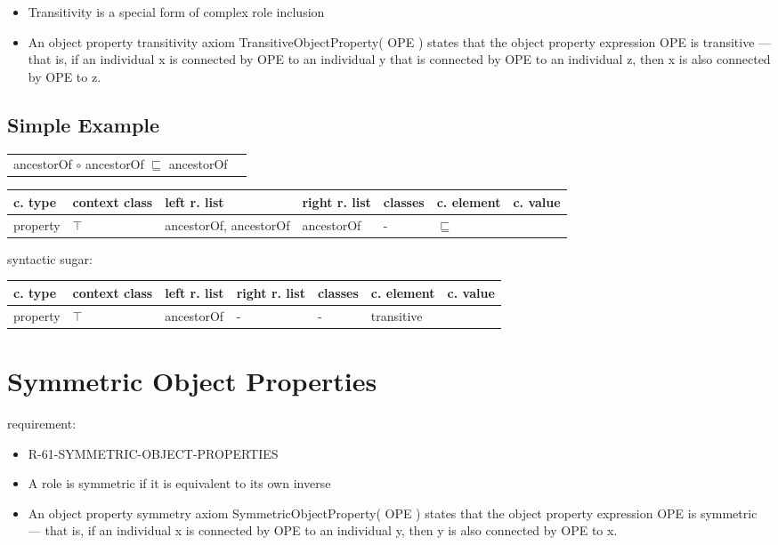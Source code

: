 \documentclass{llncs}
\newenvironment{gcotable}{
  \scriptsize
  \sffamily
  \vspace{0.3cm}
	\begin{center}
  \begin{tabular}{l|l|l|l|l|l|l}
  \hline
  \textbf{c. type} & \textbf{context class} & \textbf{left r. list} & \textbf{right r. list} & \textbf{classes} & \textbf{c. element} & \textbf{c. value} \\
  \hline

}{
  \hline
  \end{tabular}
	\end{center}
}
\newenvironment{DL}{
	\begin{center}
  \begin{tabular}{r l}

}{
  \end{tabular}
	\end{center}
}
\begin{document}
\begin{itemize}
	\item Transitivity is a special form of complex role inclusion
	\item An object property transitivity axiom TransitiveObjectProperty( OPE ) states that the object property expression OPE is transitive — that is, if an individual x is connected by OPE to an individual y that is connected by OPE to an individual z, then x is also connected by OPE to z.
\end{itemize}

\subsection{Simple Example}

\begin{DL}
ancestorOf $\circ$ ancestorOf $\sqsubseteq$ ancestorOf
\end{DL}

\begin{gcotable}
property & $\top$ & ancestorOf, ancestorOf & ancestorOf & - & $\sqsubseteq$ \\
\end{gcotable}

syntactic sugar:

\begin{gcotable}
property & $\top$ & ancestorOf & - & - & transitive \\
\end{gcotable}

\section{Symmetric Object Properties}

requirement:

\begin{itemize}
	\item R-61-SYMMETRIC-OBJECT-PROPERTIES
\end{itemize}



\begin{itemize}
	\item A role is symmetric if it is equivalent to its own inverse \cite{Kroetzsch2012}
  \item An object property symmetry axiom SymmetricObjectProperty( OPE ) states that the object property expression OPE is symmetric — that is, if an individual x is connected by OPE to an individual y, then y is also connected by OPE to x. 	
\end{itemize}
\end{document}

